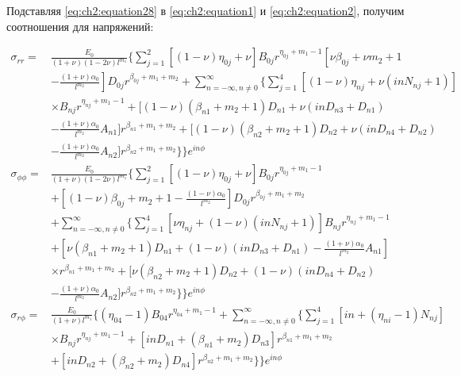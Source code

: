Подставляя \cref{eq:ch2:equation28} в  \cref{eq:ch2:equation1} и  \cref{eq:ch2:equation2}, получим соотношения для напряжений:

\begin{equation}
\label{eq:ch2:equation29}
\begin{split}
	\sigma_{rr} =& \frac{E_0}{\left (1+\nu \right ) \left (1-2\nu \right) l^{m_1}} 
		\Big \{ \sum_{j=1}^2 \left [ \left ( 1 -\nu \right ) \eta_{0j}+\nu \right ] B_{0j}r^{\eta_{0j}+m_1-1}  \left [\nu \beta_{0j} +\nu m_2 + 1 \right.  \\
	&-   \left. \frac{\left ( 1 +\nu \right ) \alpha_0}{l^{m_2}} \right ] D_{0j} r^{\beta_{0j}+m_1+m_2} +
		 \sum_{n=-\infty, n\ne 0}^{\infty} \big\{  \sum_{j=1}^4 \left [ \left ( 1 -\nu \right ) \eta_{nj} +\nu \left ( in N_{nj}+1 \right ) \right ]  \\
	&\times B_{nj} r^{\eta_{nj}+m_1-1}+\big [ \left (1-\nu \right ) \left (\beta_{n1}+m_2+1 \right ) D_{n1} + \nu \left ( in D_{n3} +D_{n1} \right )\\
	&-  \frac{\left ( 1+\nu \right ) \alpha_0}{l^{m_2}} A_{n1} \big ] r^{\beta_{n1}+m_1+m_2}+ \big [ \left (1-\nu \right ) \left ( \beta_{n2}+m_2+1 \right ) D_{n2}  +  \nu \left (inD_{n4}+D_{n2} \right )\\
	&- \frac{\left (1+\nu \right) \alpha_0}{l^{m_2}} A_{n2} \big ] r^{\beta_{n2}+m_1+m_2} \big\}  \Big \} e^{in\phi}\\
	\sigma_{\phi \phi} =& \frac{E_0}{\left (1+\nu \right ) \left (1-2\nu \right) l^{m_1}}
	 	\Big \{ \sum_{j=1}^2 \left [ \left ( 1 -\nu \right ) \eta_{0j}+\nu \right ] B_{0j}r^{\eta_{0j}+m_1-1} \\
	&+ \left [ \left ( 1 -\nu \right ) \beta_{0j}+m_2+1 - \frac{\left (1-\nu \right)\alpha_0}{l^{m_2}} \right ]D_{0j} r^{\beta_{0j}+m_1+m_2} \\
	&+  \sum_{n=-\infty, n\ne 0}^{\infty} \big\{  \sum_{j=1}^4 \left [ \nu \eta_{nj}+ \left ( 1 -\nu \right ) \left ( in N_{nj}+1 \right ) \right ]  B_{nj} r^{\eta_{nj}+m_1-1}\\
	&+ \left [ \nu \left ( \beta_{n1}+m_2+1\right ) D_{n1} + \left (1-\nu \right ) \left (inD_{n3}+D_{n1} \right )-\frac{ \left (1+\nu \right ) \alpha_0}{l^{m_2}}A_{n1}\right ]\\
	&\times r^{ \beta_{n1}+m_1+m_2} + \Big [ \nu \left (\beta_{n2}+m_2+1 \right ) D_{n2} +\left (1-\nu \right )\left ( in D_{n4}+D_{n2} \right )\\
	&- \frac{\left (1+\nu \right ) \alpha_0}{l^{m_2}}A_{n2} \Big  ] r^{\beta_{n2}+m_1+m_2} \big\}  \Big \} e^{in\phi} \\
	\sigma_{r\phi} =& \frac{E_0}{\left (1+\nu \right ) l^{m_1}}
		\Big \{ \left ( \eta_{04}-1 \right) B_{04} r^{\eta_{04}+m_1-1} +\sum_{n=-\infty, n\ne 0}^{\infty} \big\{  \sum_{j=1}^4 \left [ in+ \left (\eta_{ni} -  1  \right ) N_{nj} \right ]\\
	&\times B_{nj} r^{\eta_{nj}+m_1-1} + \left [  in D_{n1} + \left ( \beta_{n1} + m_2 \right ) D_{n3} \right ] r^{\beta_{n1}+m_1+m_2} \\
	&+\left [ in D_{n2} + \left ( \beta_{n2} + m_2 \right ) D_{n4} \right ] r^{\beta_{n2}+m_1+m_2} \big\} \Big \} e^{in\phi}
\end{split}
\end{equation}

